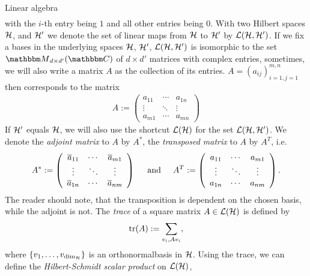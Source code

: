 \begin{section}{Linear algebra}
\begin{align}
\end{align}
with the $i$-th entry being $1$ and all other entries being $0$. With two Hilbert spaces ${\mathcal H}$, and ${\mathcal H}'$ we denote the set of linear maps from ${\mathcal H}$ to ${\mathcal H}'$ by ${\mathcal L}({\mathcal H},{\mathcal H}')$. 
If we fix a bases in the underlying spaces ${\mathcal H}$, ${\mathcal H}'$, ${\mathcal L}({\mathcal H},{\mathcal H}')$ is isomorphic to the set
 $\bbmM_{d \times d'}(\bbmC)$
of $d \times d'$ matrices with complex entries, sometimes, we will also write a matrix $A$ as the collection of its entries. $A = (a_{ij})_{i=1,j=1}^{m,n}$ then corresponds to the matrix 
\begin{align}
 A := \left( \begin{array}{ccc} a_{11} & \cdots & a_{1n} \\ \vdots & \ddots & \vdots \\ a_{m1} & \cdots & a_{mn} \end{array} \right) 
\end{align}
If ${\mathcal H}'$ equals ${\mathcal H}$, we will also use the shortcut ${\mathcal L}({\mathcal H})$ for the set ${\mathcal L}({\mathcal H},{\mathcal H}')$. We denote the \emph{adjoint matrix} to $A$ by $A^\ast$, the \emph{transposed matrix} to $A$ by $A^T$, i.e. 
\begin{align}
 A^\ast := \left( \begin{array}{ccc} \overline{a}_{11} & \cdots & \overline{a}_{m1} \\ \vdots & \ddots & \vdots \\ \overline{a}_{1n} & \cdots & \overline{a}_{nm} \end{array} \right) \hspace{.5cm} \text{and} \hspace{.5cm}
 A^T := \left( \begin{array}{ccc} a_{11} & \cdots & a_{m1} \\ \vdots & \ddots & \vdots \\ a_{1n} & \cdots & a_{nm} \end{array} \right).
\end{align}
The reader should note, that the transposition is dependent on the chosen basis, while the adjoint is not. The \emph{trace} of a square matrix $A \in {\mathcal L}({\mathcal H})$ is defined by
\begin{align}
 \mathrm{tr}(A) := \sum_{v_i, A v_i},
\end{align}
where $\{v_1,\dots, v_{\dim_{{\mathcal H}}}\}$ is an orthonormalbasis in ${\mathcal H}$. Using the trace, we can define the \emph{Hilbert-Schmidt scalar product} on ${\mathcal L}({\mathcal H})$, 
\begin{align}

\end{align}
\end{section}

